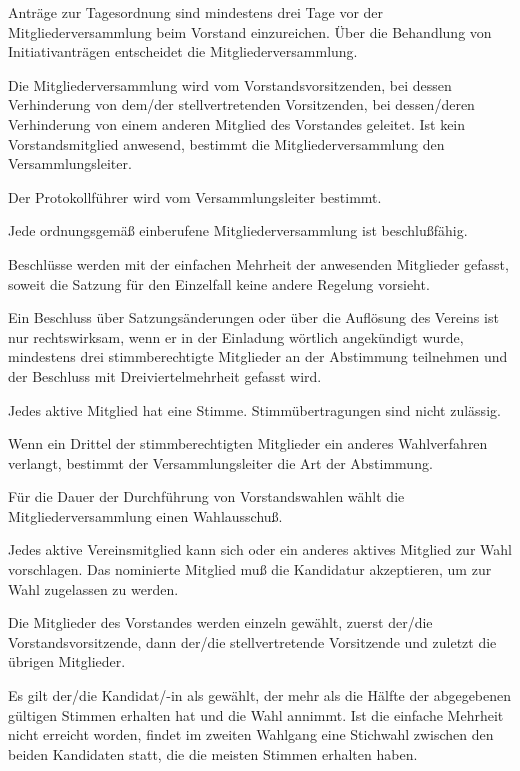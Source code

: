\documentclass[draft]{scrartcl}
\begin{document}
\begin{contract}
Anträge zur Tagesordnung sind mindestens drei Tage vor der
Mitgliederversammlung beim Vorstand einzureichen. Über die Behandlung von
Initiativanträgen entscheidet die Mitgliederversammlung.


Die Mitgliederversammlung wird vom Vorstandsvorsitzenden, bei dessen
Verhinderung von dem/der stellvertretenden Vorsitzenden, bei dessen/deren Verhinderung
von einem anderen Mitglied des Vorstandes geleitet. Ist kein Vorstandsmitglied
anwesend, bestimmt die Mitgliederversammlung den Versammlungsleiter.

Der Protokollführer wird vom Versammlungsleiter bestimmt.


Jede ordnungsgemäß einberufene Mitgliederversammlung ist beschlußfähig.

Beschlüsse werden mit der einfachen Mehrheit der anwesenden Mitglieder gefasst,
soweit die Satzung für den Einzelfall keine andere Regelung vorsieht.

Ein Beschluss über Satzungsänderungen oder über die Auflösung des Vereins ist
nur rechtswirksam, wenn er in der Einladung wörtlich angekündigt wurde,
mindestens drei stimmberechtigte Mitglieder an der Abstimmung teilnehmen und
der Beschluss mit Dreiviertelmehrheit gefasst wird.\label{MV-Aufloesung}


Jedes aktive Mitglied hat eine Stimme. Stimmübertragungen sind nicht
zulässig.\label{Stimmrechte}

Wenn ein Drittel der stimmberechtigten Mitglieder ein anderes
Wahlverfahren verlangt, bestimmt der Versammlungsleiter die Art der
Abstimmung.

Für die Dauer der Durchführung von Vorstandswahlen wählt die
Mitgliederversammlung einen Wahlausschuß.

Jedes aktive Vereinsmitglied kann sich oder ein anderes aktives Mitglied zur
Wahl vorschlagen. Das nominierte Mitglied muß die Kandidatur akzeptieren, um
zur Wahl zugelassen zu werden.

Die Mitglieder des Vorstandes werden einzeln gewählt, zuerst der/die
Vorstandsvorsitzende, dann der/die stellvertretende Vorsitzende und zuletzt
die übrigen Mitglieder.

Es gilt der/die Kandidat/-in als gewählt, der mehr als die Hälfte der
abgegebenen gültigen Stimmen erhalten hat und die Wahl annimmt. Ist die
einfache Mehrheit nicht erreicht worden, findet im zweiten Wahlgang eine
Stichwahl zwischen den beiden Kandidaten statt, die die meisten Stimmen
erhalten haben.


\end{contract}
\end{document}
